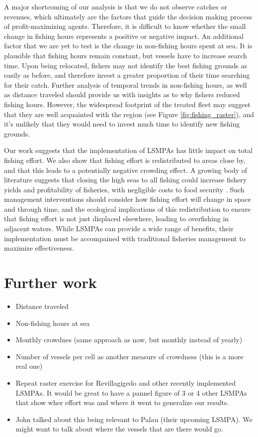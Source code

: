 \documentclass[11pt,english]{article}
\providecommand{\tightlist}{%
  \setlength{\itemsep}{0pt}\setlength{\parskip}{0pt}}
\begin{document}
A major shortcoming of our analysis is that we do not observe catches or
revenues, which ultimately are the factors that guide the decision
making process of profit-maximizing agents. Therefore, it is difficult
to know whether the small change in fishing hours represents a positive or
negative impact. An additional factor that we are yet to test is the
change in non-fishing hours spent at sea. It is plausible that fishing
hours remain constant, but vessels have to increase search time. Upon
being relocated, fishers may not identify the best fishing grounds as
easily as before, and therefore invest a greater proportion of their
time searching for their catch. Further analysis of temporal trends in
non-fishing hours, as well as distance traveled should provide us with
insights as to why fishers reduced fishing hours. However, the
widespread footprint of the treated fleet may suggest that they are well
acquainted with the region (see Figure \ref{fig:fishing_raster}), and it's
unlikely that they would need to invest much time to identify new fishing grounds.

Our work suggests that the implementation of LSMPAs has little impact on
total fishing effort. We also show that fishing effort is
redistributed to areas close by, and that this leads to a potentially
negative crowding effect. A growing body of literature suggests that
closing the high seas to all fishing could increase fishery yields and
profitability of fisheries, with negligible costs to food security
\citep{white_2014,sumaila_2015,sala_2018a,schiller_2018}. Such
management interventions should consider how fishing effort will change
in space and through time, and the ecological implications of this
redistribution to ensure that fishing effort is not just displaced
elsewhere, leading to overfishing in adjacent waters. While LSMPAs can
provide a wide range of benefits, their implementation must be
accompained with traditional fisheries management to maximize
effectiveness.

\hypertarget{further-work}{%
\section{Further work}\label{further-work}}

\begin{itemize}
\tightlist
\item
  Distance traveled
\item
  Non-fishing hours at sea
\item
  Monthly crowdnes (same approach as now, but monthly instead of yearly)
\item
  Number of vessels per cell as another measure of crowdness (this is a
  more real one)
\item
  Repeat raster exercise for Revillagigedo and other recently
  implemented LSMPAs. It would be great to have a pannel figure of 3 or
  4 other LSMPAs that show wher effort was and where it went to
  generalize our results.
\item
  John talked about this being relevant to Palau (their upcoming LSMPA).
  We might want to talk about where the vessels that are there would go.
\end{itemize}
\end{document}
